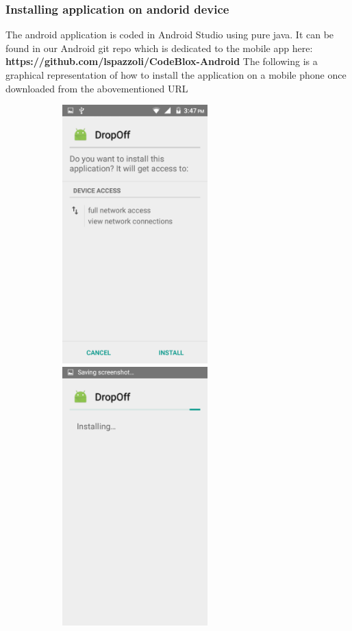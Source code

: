 \documentclass[a4paper,12pt]{article}
\begin{document}
			
			\subsubsection{Installing application on andorid device}
			The android application is coded in Android Studio using pure java. It can be found in our Android git repo which is dedicated to the mobile app here:
			\textbf{https://github.com/lspazzoli\newline/CodeBlox-Android}
			\newline\newline
			The following is a graphical representation of how to install the application on a mobile phone once downloaded from the abovementioned URL
			
			\includegraphics[width=10cm,height=10cm,keepaspectratio]{./Pictures/install1.png}
			\includegraphics[width=10cm,height=10cm,keepaspectratio]{./Pictures/install2.png}
\end{document}
